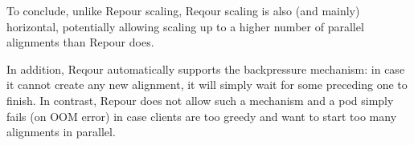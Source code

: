 \documentclass[../main.tex]{subfiles}
\begin{document}
To conclude, unlike Repour scaling, Reqour scaling is also (and mainly) horizontal, potentially allowing scaling up to a higher number of parallel alignments than Repour does.

In addition, Reqour automatically supports the backpressure mechanism: in case it cannot create any new alignment, it will simply wait for some preceding one to finish. In contrast, Repour does not allow such a mechanism and a pod simply fails (on OOM error) in case clients are too greedy and want to start too many alignments in parallel.
\end{document}
